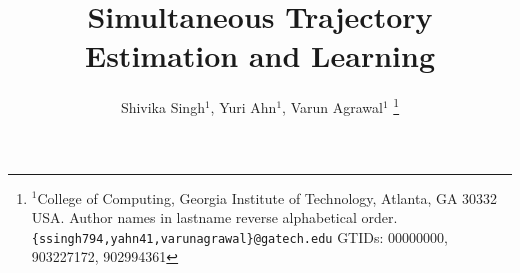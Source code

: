 \documentclass[letterpaper, 10 pt, conference]{ieeeconf}  %
\title{\LARGE \bf
    Simultaneous Trajectory Estimation and Learning
}
\author{Shivika Singh$^{1}$, Yuri Ahn$^{1}$, Varun Agrawal$^{1}$%
    \thanks{$^{1}$College of Computing, Georgia Institute of Technology, Atlanta, GA 30332 USA. Author names in lastname reverse alphabetical order.
        {\tt\small \{ssingh794,yahn41,varunagrawal\}@gatech.edu}
        GTIDs: 00000000, 903227172, 902994361}%
}
\begin{document}
    
    
    
    \maketitle
    \thispagestyle{empty}
    \pagestyle{empty}
    
    
    \begin{abstract}
    \end{abstract}
    
    
    
    
    
    
    
    
    
    
    
    \newpage
    \printbibliography
    
    
\end{document}
